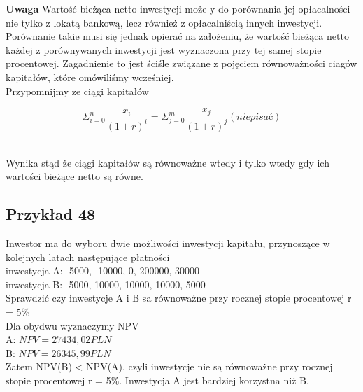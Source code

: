 \documentclass{article}
\begin{document}
\textbf{Uwaga} Wartość bieżąca netto inwestycji może y do porównania jej opłacalności nie tylko z lokatą bankową, lecz również z opłacalniścią innych inwestycji. Porównanie takie musi się jednak opierać na założeniu, że wartość bieżąca netto każdej z porównywanych inwestycji jest wyznaczona przy tej samej stopie procentowej. Zagadnienie to jest ściśle związane z pojęciem równoważności ciagów kapitałów, które omówiliśmy wcześniej.\\

Przypomnijmy ze ciągi kapitałów 

\begin{center}
	\begin{equation}
		\Sigma ^n_{i=0}\frac{x_i}{(1 + r)^i} = \Sigma ^m_{j=0}\frac{x_j}{(1 + r)^j} (nie pisać)
	\end{equation}
\end{center}\\

Wynika stąd że ciągi kapitałów są równoważne wtedy i tylko wtedy gdy ich wartości bieżące netto są równe.

\subsection{Przykład 48}
Inwestor ma do wyboru dwie możliwości inwestycji kapitału, przynoszące w kolejnych latach następujące płatności\\

inwestycja A: -5000, -10000, 0, 200000, 30000\\

inwestycja B: -5000, 10000, 10000, 10000, 5000\\

Sprawdzić czy inwestycje A i B sa równoważne przy rocznej stopie procentowej r = 5\%\\

Dla obydwu wyznaczymy NPV\\

A: $ NPV = 27 434,02 PLN $\\

B: $ NPV = 26 345,99 PLN $\\

Zatem NPV(B) < NPV(A), czyli inwestycje nie są równoważne przy rocznej stopie procentowej r = 5\%. Inwestycja A jest bardziej korzystna niż B.







%		
\end{document}
